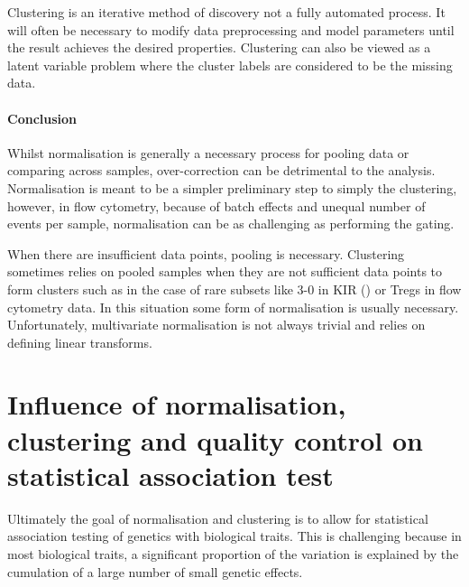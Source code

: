 Clustering is an iterative method of discovery not a fully automated process.
It will often be necessary to modify data preprocessing and model parameters until the result achieves the desired properties.  
Clustering can also be viewed as a latent variable problem where the cluster labels are considered to be the missing data.

\paragraph{Conclusion}

Whilst normalisation is generally a necessary process for pooling data or comparing across samples, over-correction can be detrimental to the analysis.
Normalisation is meant to be a simpler preliminary step to simply the clustering,
however, in flow cytometry, because of batch effects and unequal number of events per sample, normalisation can be as challenging as performing the gating.

When there are insufficient data points, pooling is necessary.
Clustering sometimes relies on pooled samples when they are not sufficient data points
to form clusters such as in the case of rare subsets like 3-0 in KIR () or Tregs in flow cytometry data.
In this situation some form of normalisation is usually necessary.
Unfortunately, multivariate normalisation is not always trivial and relies on defining linear transforms. 


\section{ Influence of normalisation, clustering and quality control on statistical association test }

Ultimately the goal of normalisation and clustering is to allow for statistical association testing of genetics with biological traits.
This is challenging because in most biological traits, a significant proportion of the variation is explained by the cumulation of a large number of small genetic effects.

